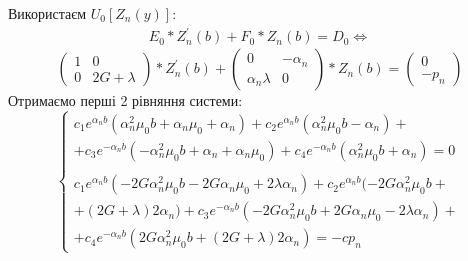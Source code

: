 Використаєм $U_0\left[ Z_n(y) \right]$:
\begin{eqnarray*}
    E_0 * Z_n^{'}(b) + F_0 * Z_n(b) = D_0 \Leftrightarrow
\end{eqnarray*}
\begin{equation*}
    \begin{pmatrix}
        1 & 0 \\
        0 & 2G + \lambda
    \end{pmatrix} * Z_n^{'}(b) + \begin{pmatrix}
        0 & -\alpha_n \\
        \alpha_n \lambda & 0
    \end{pmatrix} * Z_n(b) = \begin{pmatrix}
        0 \\
        -p_n
    \end{pmatrix}
\end{equation*}
Отримаємо перші 2 рівняння системи:
\begin{equation*}
    \begin{cases}
        c_1 e^{\alpha_n b} (\alpha_n^2 \mu_0 b + \alpha_n \mu_0 + \alpha_n) + c_2 e^{\alpha_n b} (\alpha_n^2 \mu_0 b - \alpha_n) + \\
        + c_3 e^{-\alpha_n b} (-\alpha_n^2 \mu_0 b + \alpha_n + \alpha_n \mu_0) + c_4 e^{-\alpha_n b} (\alpha_n^2 \mu_0 b + \alpha_n) = 0 \\
        \\
        c_1 e^{\alpha_n b} (-2 G \alpha_n^2 \mu_0 b - 2 G \alpha_n \mu_0 + 2 \lambda \alpha_n) + c_2 e^{\alpha_n b} (-2G \alpha_n^2 \mu_0 b + \\
        + (2G + \lambda) 2 \alpha_n) + c_3  e^{-\alpha_n b} (-2 G \alpha_n^2 \mu_0 b + 2G \alpha_n \mu_0 - 2\lambda \alpha_n) + \\ 
        + c_4 e^{-\alpha_n b} (2G \alpha_n^2 \mu_0 b + (2G + \lambda) 2 \alpha_n) = -c p_n
    \end{cases}
\end{equation*}

